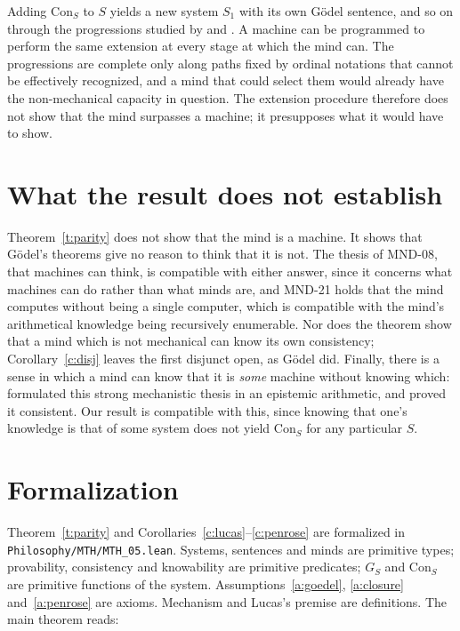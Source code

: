 \documentclass{situationist-preprint}
\begin{document}
\begin{reply}
Adding $\mathrm{Con}_S$ to $S$ yields a new system $S_1$ with its own G\"odel sentence, and so on through the progressions studied by \citet{Turing1939} and \citet{Feferman1962}. A machine can be programmed to perform the same extension at every stage at which the mind can. The progressions are complete only along paths fixed by ordinal notations that cannot be effectively recognized, and a mind that could select them would already have the non-mechanical capacity in question. The extension procedure therefore does not show that the mind surpasses a machine; it presupposes what it would have to show.
\end{reply}

\section{What the result does not establish}

Theorem~\ref{t:parity} does not show that the mind is a machine. It shows that G\"odel's theorems give no reason to think that it is not. The thesis of MND-08, that machines can think, is compatible with either answer, since it concerns what machines can do rather than what minds are, and MND-21 holds that the mind computes without being a single computer, which is compatible with the mind's arithmetical knowledge being recursively enumerable. Nor does the theorem show that a mind which is not mechanical can know its own consistency; Corollary~\ref{c:disj} leaves the first disjunct open, as G\"odel did. Finally, there is a sense in which a mind can know that it is \emph{some} machine without knowing which: \citet{Reinhardt1986} formulated this strong mechanistic thesis in an epistemic arithmetic, and \citet{Carlson2000} proved it consistent. Our result is compatible with this, since knowing that one's knowledge is that of some system does not yield $\mathrm{Con}_S$ for any particular $S$.

\section{Formalization}

Theorem~\ref{t:parity} and Corollaries~\ref{c:lucas}--\ref{c:penrose} are formalized in \nolinkurl{Philosophy/MTH/MTH_05.lean}. Systems, sentences and minds are primitive types; provability, consistency and knowability are primitive predicates; $G_S$ and $\mathrm{Con}_S$ are primitive functions of the system. Assumptions~\ref{a:goedel}, \ref{a:closure} and~\ref{a:penrose} are axioms. Mechanism and Lucas's premise are definitions. The main theorem reads:
\end{document}

